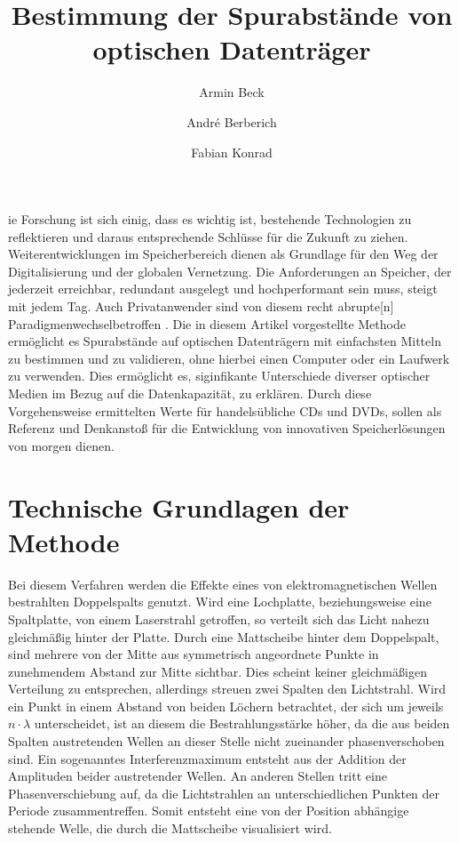 \documentclass[9pt,twocolumn,twoside]{pnas-new}
\title{Bestimmung der Spurabstände von optischen Datenträger}
\author[a]{Armin Beck}
\author[a]{André Berberich}
\author[a]{Fabian Konrad}
\affil[a]{Student der DHBW Mosbach}
\begin{document}
\verticaladjustment{-2pt}

\maketitle
\thispagestyle{firststyle}

ie Forschung ist sich einig, dass es wichtig ist, bestehende Technologien zu reflektieren und daraus entsprechende Schlüsse für die Zukunft zu ziehen. Weiterentwicklungen im Speicherbereich dienen als Grundlage für den Weg der Digitalisierung und der globalen Vernetzung. 
Die Anforderungen an Speicher, der jederzeit erreichbar, redundant ausgelegt und hochperformant sein muss, steigt mit jedem Tag.
Auch Privatanwender sind von diesem \glqq recht abrupte[n] Paradigmenwechsel\grqq \space betroffen \cite[Heft 10/2012 S.102]{CT1990}.
Die in diesem Artikel vorgestellte Methode ermöglicht es Spurabstände auf optischen Datenträgern mit einfachsten Mitteln zu bestimmen und zu validieren, ohne hierbei einen Computer oder ein Laufwerk zu verwenden. Dies ermöglicht es, siginfikante Unterschiede diverser optischer Medien im Bezug auf die Datenkapazität, zu erklären. Durch diese Vorgehensweise ermittelten Werte für handelsübliche CDs und DVDs, sollen als Referenz und Denkanstoß für die Entwicklung von innovativen Speicherlösungen von morgen dienen.

\section*{Technische Grundlagen der Methode}
Bei diesem Verfahren werden die Effekte eines von elektromagnetischen Wellen bestrahlten Doppelspalts genutzt.
 Wird eine Lochplatte, beziehungsweise eine Spaltplatte, von einem Laserstrahl getroffen, so verteilt sich das Licht nahezu gleichmäßig hinter der Platte.
 Durch eine Mattscheibe hinter dem Doppelspalt, sind mehrere von der Mitte aus symmetrisch angeordnete Punkte in zunehmendem Abstand zur Mitte sichtbar.
Dies scheint keiner gleichmäßigen Verteilung zu entsprechen, allerdings streuen zwei Spalten den Lichtstrahl.
Wird ein Punkt in einem Abstand von beiden Löchern betrachtet, der sich um jeweils \begin{math}n\cdot\lambda\end{math} unterscheidet, ist an diesem die Bestrahlungsstärke höher, da die aus beiden Spalten austretenden Wellen an dieser Stelle nicht zueinander phasenverschoben sind. Ein sogenanntes Interferenzmaximum entsteht aus der Addition der Amplituden beider austretender Wellen. An anderen Stellen tritt eine Phasenverschiebung auf, da die Lichtstrahlen an unterschiedlichen Punkten der Periode zusammentreffen. Somit entsteht eine von der Position abhängige stehende Welle, die durch die Mattscheibe visualisiert wird.
\end{document}
